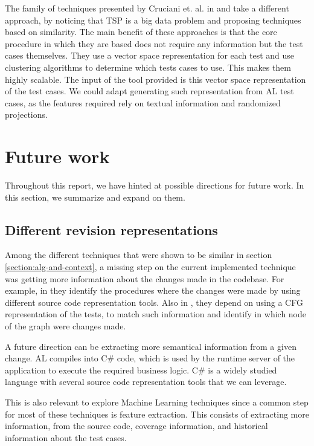 \documentclass{article}
\begin{document}
The family of techniques presented by Cruciani et. al. in \cite{10.1109/ICSE.2019.00055} and \cite{10.1145/3180155.3180210} take a different approach, by noticing that TSP is a big data problem and proposing techniques based on similarity. The main benefit of these approaches is that the core procedure in which they are based does not require any information but the test cases themselves. They use a vector space representation for each test and use clustering algorithms to determine which tests cases to use. This makes them highly scalable. The input of the tool provided is this vector space representation of the test cases. We could adapt generating such representation from AL test cases, as the features required rely on textual information and randomized projections.

\section{Future work}\label{section:future-work}
Throughout this report, we have hinted at possible directions for future work. In this section, we summarize and expand on them. 

\subsection{Different revision representations}
Among the different techniques that were shown to be similar in section \ref{section:alg-and-context}, a missing step on the current implemented technique was getting more information about the changes made in the codebase. For example, in \cite{6405252} they identify the procedures where the changes were made by using different source code representation tools. Also in \cite{962562}, they depend on using a CFG representation of the tests, to match such information and identify in which node of the graph were changes made.

A future direction can be extracting more semantical information from a given change. AL compiles into C\# code, which is used by the runtime server of the application to execute the required business logic. C\# is a widely studied language with several source code representation tools that we can leverage.

This is also relevant to explore Machine Learning techniques since a common step for most of these techniques is feature extraction. This consists of extracting more information, from the source code, coverage information, and historical information about the test cases.
\end{document}
